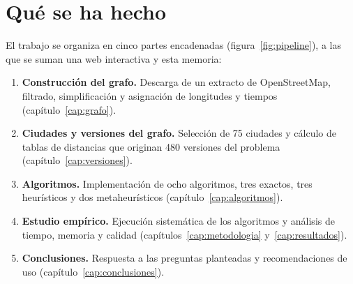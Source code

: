 \section{Qué se ha hecho}

El trabajo se organiza en cinco partes encadenadas (figura~\ref{fig:pipeline}), a las que se suman una web interactiva y esta memoria:
\begin{enumerate}[label=\textbf{Parte \arabic*.},leftmargin=*,labelsep=0.5em]
  \item \textbf{Construcción del grafo.} Descarga de un extracto de OpenStreetMap, filtrado, simplificación y asignación de longitudes y tiempos (capítulo~\ref{cap:grafo}).
  \item \textbf{Ciudades y versiones del grafo.} Selección de 75 ciudades y cálculo de tablas de distancias que originan 480 versiones del problema (capítulo~\ref{cap:versiones}).
  \item \textbf{Algoritmos.} Implementación de ocho algoritmos, tres exactos, tres heurísticos y dos metaheurísticos (capítulo~\ref{cap:algoritmos}).
  \item \textbf{Estudio empírico.} Ejecución sistemática de los algoritmos y análisis de tiempo, memoria y calidad (capítulos~\ref{cap:metodologia} y~\ref{cap:resultados}).
  \item \textbf{Conclusiones.} Respuesta a las preguntas planteadas y recomendaciones de uso (capítulo~\ref{cap:conclusiones}).
\end{enumerate}

